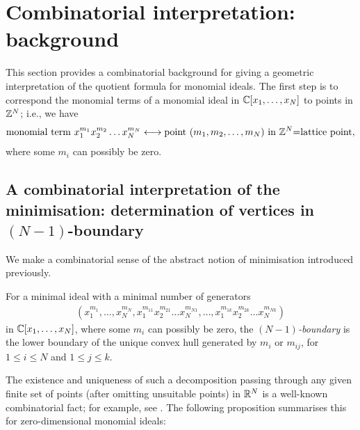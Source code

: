 \documentclass[11pt,a4paper,leqno,noamsfonts]{amsart}
\numberwithin{equation}{section}
\begin{document}
  
  \section{Combinatorial interpretation: background}

This section provides a combinatorial background for giving a geometric interpretation of the quotient formula for monomial ideals. The first step is to correspond the monomial terms of a monomial ideal in ${\mathbb{C}}[x_1,\ldots,x_N]$ to points in ${\mathbb{Z}}^N$; i.e., we have
\begin{align*}
    \text{monomial term $x_1^{m_1}x_2^{m_2}\ldots x_N^{m_N}$}\longleftrightarrow\text{point $(m_1,m_2,\ldots,m_N)$ in ${\mathbb{Z}}^N$=\text{lattice point}},
\end{align*}
where some $m_i$ can possibly be zero.





\subsection[$(N-1)$-boundary]{A combinatorial interpretation of the minimisation: determination of vertices in $(N-1)$-boundary} We make a combinatorial sense of the abstract notion of minimisation introduced previously. 

\begin{definition}[$(N-1)$-boundary]
For a minimal ideal with a minimal number of generators \begin{align*}
(x_1^{m_1},\ldots,x_N^{m_N},x_1^{m_{11}}x_2^{m_{21}}\ldots x_N^{m_{N1}},\ldots,x_1^{m_{1k}}x_2^{m_{2k}}\ldots x_N^{m_{Nk}})\end{align*} in ${\mathbb{C}}[x_1,\ldots,x_N]$, where some $m_i$ can possibly be zero, the \textit{$(N-1)$-boundary}  is the lower boundary of the unique convex hull generated by $m_i$ or $m_{ij}$,  
for $1\leq i \leq N$ and $1\leq j \leq k$. 
\end{definition}


The existence and uniqueness of such a decomposition passing through any given finite set of points (after omitting unsuitable points) in ${\mathbb{R}}^N$ is a well-known combinatorial fact; for example, see \cite[Corollary 1.7]{bruns2009polytopes}.  The following proposition summarises this for zero-dimensional monomial ideals:
\end{document}
